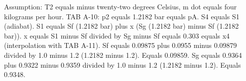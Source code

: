 Assumption: T2 equals minus twenty-two degrees Celsius, m dot equals four kilograms per hour. 
TAB A-10: p2 equals 1.2182 bar equals pA.
S4 equals S1 (adiabat).
S1 equals Sf (1.2182 bar) plus x (Sg (1.2182 bar) minus Sf (1.2182 bar)).
x equals S1 minus Sf divided by Sg minus Sf equals 0.303 equals x4 (interpolation with TAB A-11).
Sf equals 0.09875 plus 0.0955 minus 0.09879 divided by 1.0 minus 1.2 (1.2182 minus 1.2).
Equals 0.09859.
Sg equals 0.9364 plus 0.9322 minus 0.9359 divided by 1.0 minus 1.2 (1.2182 minus 1.2).
Equals 0.9348.
